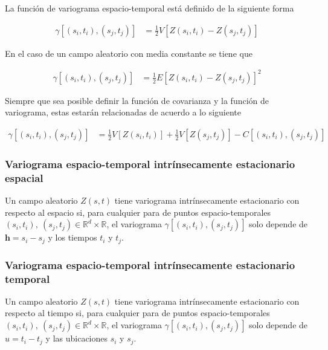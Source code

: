 \documentclass[
]{book}
\begin{document}
La función de variograma espacio-temporal está definido de la siguiente forma

\begin{align}
\gamma[(s_i,t_i),(s_j,t_j)]&=\frac{1}{2}V[Z(s_i,t_i)-Z(s_j,t_j)]
\end{align}

En el caso de un campo aleatorio con media constante se tiene que

\begin{align}
\gamma[(s_i,t_i),(s_j,t_j)]&=\frac{1}{2}E[Z(s_i,t_i)-Z(s_j,t_j)]^2
\end{align}

Siempre que sea posible definir la función de covarianza y la función de variograma, estas estarán relacionadas de acuerdo a lo siguiente

\begin{align}
\gamma[(s_i,t_i),(s_j,t_j)]&=\frac{1}{2}V[Z(s_i,t_i)]+\frac{1}{2}V[Z(s_j,t_j)]-C[(s_i,t_i),(s_j,t_j)]
\label{eq:varivar}
\end{align}

\hypertarget{variograma-espacio-temporal-intruxednsecamente-estacionario-espacial}{%
\subsubsection*{Variograma espacio-temporal intrínsecamente estacionario espacial}\label{variograma-espacio-temporal-intruxednsecamente-estacionario-espacial}}

Un campo aleatorio \(Z(s,t)\) tiene variograma intrínsecamente estacionario con respecto al espacio si, para cualquier para de puntos espacio-temporales \((s_i,t_i), \ (s_j,t_j) \in \mathbb{R}^d \times \mathbb{R}\), el variograma \(\gamma[(s_i,t_i),(s_j,t_j)]\) solo depende de \(\textbf{h}=s_i-s_j\) y los tiempos \(t_i\) y \(t_j\).

\hypertarget{variograma-espacio-temporal-intruxednsecamente-estacionario-temporal}{%
\subsubsection*{Variograma espacio-temporal intrínsecamente estacionario temporal}\label{variograma-espacio-temporal-intruxednsecamente-estacionario-temporal}}

Un campo aleatorio \(Z(s,t)\) tiene variograma intrínsecamente estacionario con respecto al tiempo si, para cualquier para de puntos espacio-temporales \((s_i,t_i), \ (s_j,t_j) \in \mathbb{R}^d \times \mathbb{R}\), el variograma \(\gamma[(s_i,t_i),(s_j,t_j)]\) solo depende de \(u=t_i-t_j\) y las ubicaciones \(s_i\) y \(s_j\).
\end{document}
